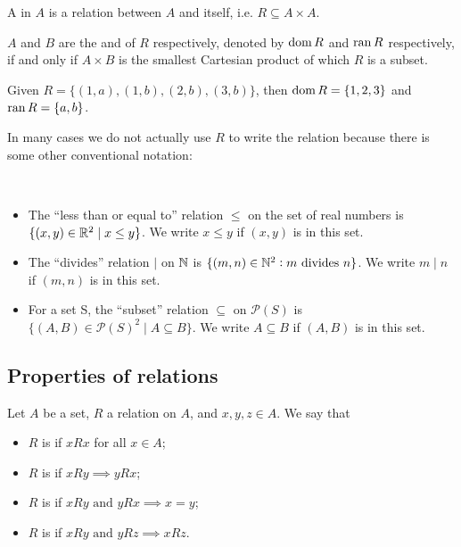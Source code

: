 \begin{definition}
A  in $A$ is a relation between $A$ and itself, i.e. $R \subseteq A \times A$.
\end{definition}

$A$ and $B$ are the  and  of $R$ respectively, denoted by $\operatorname{dom} R$ and $\operatorname{ran} R$ respectively, if and only if $A \times B$ is the smallest Cartesian product of which $R$ is a subset.

\begin{example}
Given $R=\{(1,a),(1,b),(2,b),(3,b)\}$, then $\operatorname{dom} R=\{1,2,3\}$ and $\operatorname{ran} R=\{a,b\}$.
\end{example}

In many cases we do not actually use $R$ to write the relation because there is some other conventional notation:

\begin{example} \
\begin{itemize}
\item The ``less than or equal to'' relation $\le$ on the set of real numbers is $\{(x,y) \in \mathbb R^2 \mid x \le y\}$. We write $x \le y$ if $(x,y)$ is in this set.
\item The ``divides'' relation $\mid$ on $\mathbb N$ is $\{(m,n) \in \mathbb N^2: m \text{ divides } n\}$. We write $m \mid n$ if $(m,n)$ is in this set.
\item For a set S, the ``subset'' relation $\subseteq$ on $\mathcal{P}(S)$ is $\{(A,B) \in \mathcal{P}(S)^2 \mid A \subseteq B\}$. We write $A \subseteq B$ if $(A,B)$ is in this set.
\end{itemize}
\end{example}
\pagebreak

\subsection{Properties of relations}
Let $A$ be a set, $R$ a relation on $A$, and $x,y,z \in A$. We say that
\begin{itemize}
\item $R$ is  if $xRx$ for all $x\in A$;
\item $R$ is  if $xRy \implies yRx$;
\item $R$ is  if $xRy \text{ and } yRx \implies x=y$;
\item $R$ is \vocab{transitive} if $xRy \text{ and } yRz \implies xRz$.
\end{itemize}


